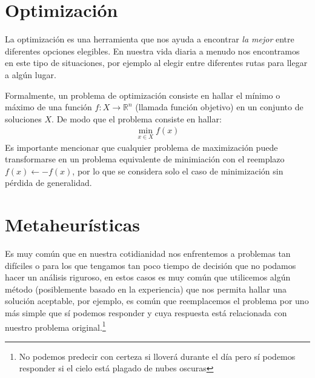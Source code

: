 \section{Optimización}
La optimización es una herramienta que nos ayuda a encontrar \textit{la mejor} entre diferentes opciones elegibles. En nuestra vida diaria a menudo nos encontramos en este tipo de situaciones, por ejemplo al elegir entre diferentes rutas para llegar a algún lugar.

Formalmente, un problema de optimización consiste en hallar el mínimo o máximo de una función $f:X\rightarrow \mathbb{R}^n$ (llamada función objetivo) en un conjunto de soluciones $X$. De modo que el problema consiste en hallar:
\begin{gather}
\min_{x\in X} f(x)
\end{gather}
Es importante mencionar que cualquier problema de maximización puede transformarse en un problema equivalente de minimiación con el reemplazo $f(x) \leftarrow -f(x)$, por lo que se considera solo el caso de minimización sin pérdida de generalidad.


\section{Metaheurísticas}
Es muy común que en nuestra cotidianidad nos enfrentemos a problemas tan difíciles o para los que tengamos tan poco tiempo de decisión que no podamos hacer un análisis riguroso, en estos casos es muy común que utilicemos algún método (posiblemente basado en la experiencia) que nos permita hallar una solución aceptable, por ejemplo, es común que reemplacemos el problema por uno más simple que sí podemos responder y cuya respuesta está relacionada con nuestro problema original.\footnote{No podemos predecir con certeza si lloverá durante el día pero sí podemos responder si el cielo está plagado de nubes oscuras}  


